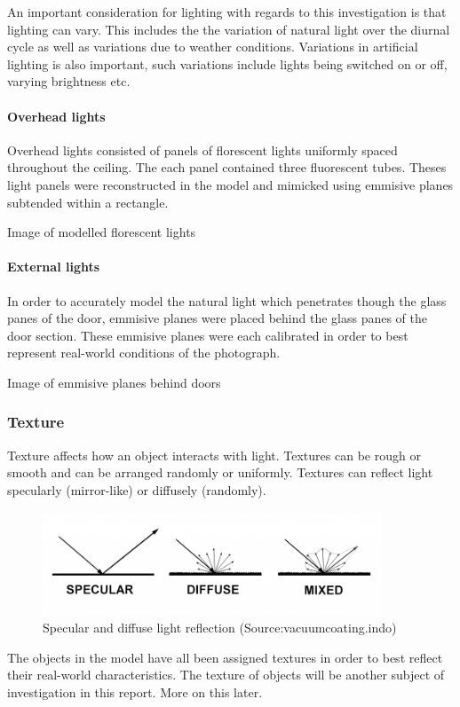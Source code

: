 \documentclass[11pt,a4paper]{report}
\begin{document}
				An important consideration for lighting with regards to this investigation is that lighting can vary. This includes the the variation of natural light over the diurnal cycle as well as variations due to weather conditions. Variations in artificial lighting is also important, such variations include lights being switched on or off, varying brightness etc.
				\paragraph{Overhead lights}
					Overhead lights consisted of panels of florescent lights uniformly spaced throughout the ceiling. The each panel contained three fluorescent tubes. Theses light panels were reconstructed in the model and mimicked using emmisive planes subtended within a rectangle.
					
					{{Image of modelled florescent lights}}
				
				\paragraph{External lights}
					In order to accurately model the natural light which penetrates though the glass panes of the door, emmisive planes were placed behind the glass panes of the door section. These emmisive planes were each calibrated in order to best represent real-world conditions of the photograph.
					
					{{Image of emmisive planes behind doors}}
			\subsubsection{Texture}
				Texture affects how an object interacts with light. Textures can be rough or smooth and can be arranged randomly or uniformly. Textures can reflect light specularly (mirror-like) or diffusely (randomly).
				\begin{figure}[H]
					\centering
					\includegraphics[width=0.9\textwidth]{light_reflection}
					\caption{Specular and diffuse light reflection (Source:vacuumcoating.indo)}
					\label{fig:light_reflection}
				\end{figure}
				The objects in the model have all been assigned textures in order to best reflect their real-world characteristics. The texture of objects will be another subject of investigation in this report. More on this later.
				
\end{document}
